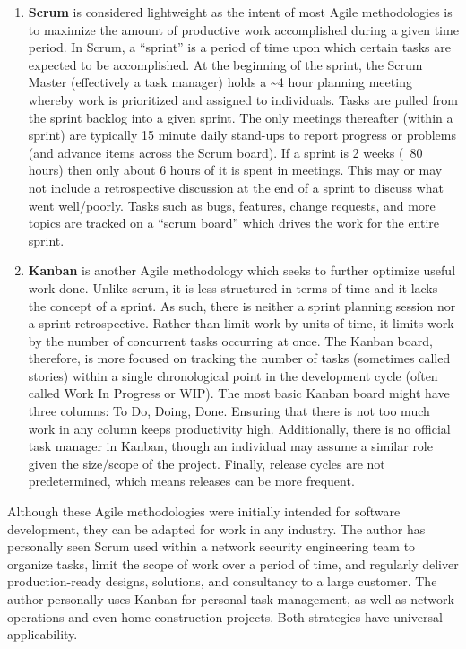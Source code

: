 \begin{enumerate}
  \item \textbf{Scrum} is considered lightweight as the intent of most Agile
  methodologies is to maximize the amount of productive work accomplished
  during a given time period. In Scrum, a ``sprint'' is a period of time upon
  which certain tasks are expected to be accomplished. At the beginning of the
  sprint, the Scrum Master (effectively a task manager) holds a
  \textasciitilde{}4 hour planning meeting whereby work is prioritized and
  assigned to individuals.  Tasks are pulled from the sprint backlog into a
  given sprint. The only meetings thereafter (within a sprint) are typically
  15 minute daily stand-ups to report progress or problems (and advance items
  across the Scrum board). If a sprint is 2 weeks (~80 hours) then only about
  6 hours of it is spent in meetings. This may or may not include a
  retrospective discussion at the end of a sprint to discuss what went
  well/poorly. Tasks such as bugs, features, change requests, and more topics
  are tracked on a ``scrum board'' which drives the work for the entire sprint.
  \item \textbf{Kanban} is another Agile methodology which seeks to further
  optimize useful work done. Unlike scrum, it is less structured in terms of
  time and it lacks the concept of a sprint. As such, there is neither a
  sprint planning session nor a sprint retrospective. Rather than limit work
  by units of time, it limits work by the number of concurrent tasks occurring
  at once. The Kanban board, therefore, is more focused on tracking the number
  of tasks (sometimes called stories) within a single chronological point in
  the development cycle (often called Work In Progress or WIP). The most basic
  Kanban board might have three columns: To Do, Doing, Done. Ensuring that
  there is not too much work in any column keeps productivity high.
  Additionally, there is no official task manager in Kanban, though an
  individual may assume a similar role given the size/scope of the project.
  Finally, release cycles are not predetermined, which means releases can be
  more frequent.
\end{enumerate}

Although these Agile methodologies were initially intended for software
development, they can be adapted for work in any industry. The author has
personally seen Scrum used within a network security engineering team to
organize tasks, limit the scope of work over a period of time, and regularly
deliver production-ready designs, solutions, and consultancy to a large customer.
The author personally uses Kanban for personal task management, as well as
network operations and even home construction projects. Both strategies have
universal applicability.
